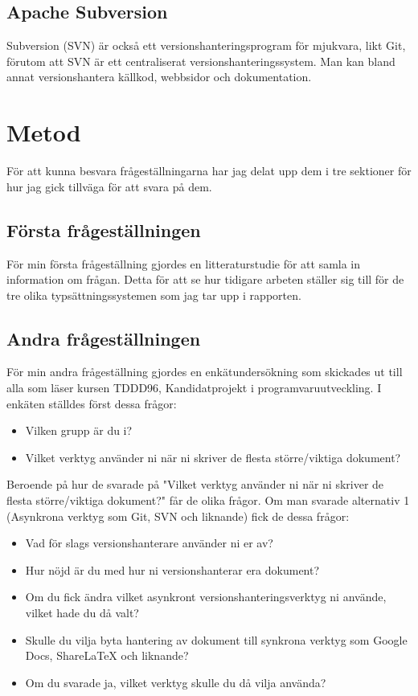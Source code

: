 \subsection{Apache Subversion}
Subversion (SVN) är också ett versionshanteringsprogram för mjukvara, likt Git, förutom att SVN är ett centraliserat versionshanteringssystem. Man kan bland annat versionshantera källkod, webbsidor och dokumentation. 

\section{Metod}
\label{sec:method-tuhkala}
För att kunna besvara frågeställningarna har jag delat upp dem i tre sektioner för hur jag gick tillväga för att svara på dem.

\subsection{Första frågeställningen}
För min första frågeställning gjordes en litteraturstudie för att samla in information om frågan. Detta för att se hur tidigare arbeten ställer sig till för de tre olika typsättningssystemen som jag tar upp i rapporten.

\subsection{Andra frågeställningen}
För min andra frågeställning gjordes en enkätundersökning som skickades ut till alla som läser kursen TDDD96, Kandidatprojekt i programvaruutveckling. I enkäten ställdes först dessa frågor:
\begin{itemize}
	\item Vilken grupp är du i?
	\item Vilket verktyg använder ni när ni skriver de flesta större/viktiga dokument?
\end{itemize}

Beroende på hur de svarade på "Vilket verktyg använder ni när ni skriver de flesta större/viktiga dokument?" får de olika frågor. Om man svarade alternativ 1 (Asynkrona verktyg som Git, SVN och liknande) fick de dessa frågor:

\begin{itemize}
	\item Vad för slags versionshanterare använder ni er av?
	\item Hur nöjd är du med hur ni versionshanterar era dokument?
	\item Om du fick ändra vilket asynkront versionshanteringsverktyg ni använde, vilket hade du då valt?
	\item Skulle du vilja byta hantering av dokument till synkrona verktyg som Google Docs, ShareLaTeX och liknande?
	\item Om du svarade ja, vilket verktyg skulle du då vilja använda?
\end{itemize}

